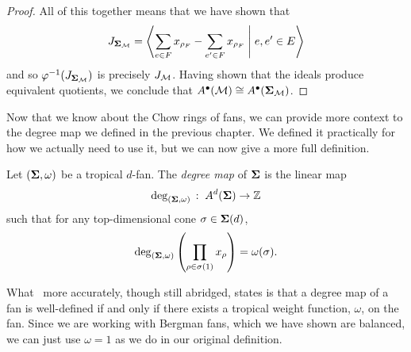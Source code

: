 \documentclass[12pt,oneside]{../../sfsuthesis}
\begin{document}
\begin{proof}
    All of this together means that we have shown that
    \[
        J_{{\bm{\Sigma}}_{\mathcal{M}}} = \left\langle \sum_{e \in F} x_{\rho_F} - \sum_{e' \in F} x_{\rho_F} \; \middle| \; e, e' \in E   \right\rangle
    \]
    and so \( \varphi^{-1}(J_{{\bm{\Sigma}}_{\mathcal{M}}}) \) is precisely \( J_{\mathcal{M}} \).
    Having shown that the ideals produce equivalent quotients, we conclude that \( A^\bullet(\mathcal{M}) \cong A^\bullet({\bm{\Sigma}}_{\mathcal{M}}) \).
\end{proof}

Now that we know about the Chow rings of fans, we can provide more context to the degree map we defined in the previous chapter.
We defined it practically for how we actually need to use it, but we can now give a more full definition.
\begin{definition}\th\label{def:degMapFan}
    Let \( ({\bm{\Sigma}}, \omega) \) be a tropical \( d \)-fan.
    The \emph{degree map} of \( {\bm{\Sigma}} \) is the linear map
    \[
        \deg_{({\bm{\Sigma}}, \omega)}\,:\; A^d({\bm{\Sigma}})  \to \mathbb{Z}
    \]
    such that for any top-dimensional cone \( \sigma \in {\bm{\Sigma}}(d) \),
    \[
        \deg_{({\bm{\Sigma}},\omega)}\left( \prod_{\rho \in \sigma(1)} x_\rho \right) = \omega(\sigma).
    \]
\end{definition}
What~\cite[Proposition~5.6]{adiprasitoHodgeTheoryCombinatorial2018} more accurately, though still abridged, states is that a degree map of a fan is well-defined if and only if there exists a tropical weight function, \( \omega \), on the fan.
Since we are working with Bergman fans, which we have shown are balanced, we can just use \( \omega = 1 \) as we do in our original definition.
\end{document}
